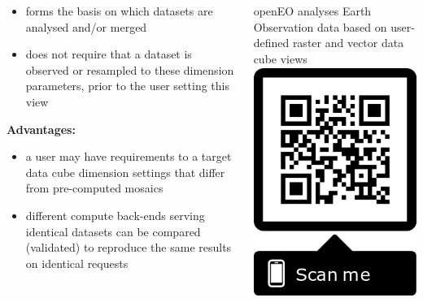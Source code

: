 \documentclass{beamer}
\begin{document}
\begin{frame}{}
\begin{columns}[t]
\begin{column}{.22\linewidth}
{\begin{itemize}
          \item  forms the basis on which datasets are analysed and/or merged
          \item  does not require that a dataset is observed or resampled to these dimension parameters, prior to the user setting this view
          \end{itemize}
          {\bf Advantages:}
          \begin{itemize}
          \item a user may have requirements to a target data cube dimension settings that differ from pre-computed mosaics
          \item different compute back-ends  serving identical datasets can be compared (validated) to reproduce the same results on identical requests
          \end{itemize}
      }
      \end{column}
      
      \begin{column}{.6\linewidth}
        \begin{block}{}
        
        \begin{center}
        {\fontsize{130}{162} \selectfont 
        \begin{minipage}{0.8\linewidth}
        \vspace{10cm}
        \raggedright
        {\color{white}
        {\color{yw}openEO} analyses Earth Observation data based on {\color{yw}user-defined} raster and vector data cube {\color{yw}views}
        } \\
        \vspace{18cm}
        \includegraphics[height=7.5cm]{frame.png}
        \end{minipage}
        }
        \end{center}
        \vspace{10cm}
        \end{block}


\end{column}
\end{columns}
\end{frame}
\end{document}
